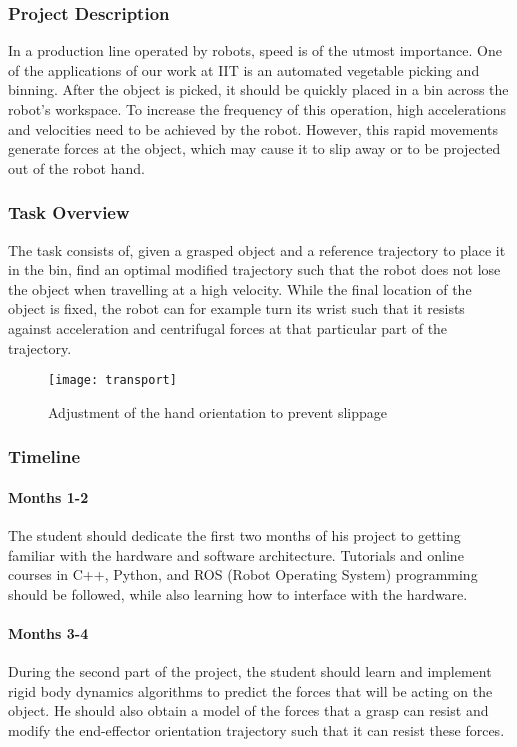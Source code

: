 
\subsubsection{Project Description}
In a production line operated by robots, speed is of the utmost importance. 
One of the applications of our work at IIT is an automated vegetable picking and binning.
After the object is picked, it should be quickly placed in a bin across the robot's workspace.
To increase the frequency of this operation, high accelerations and velocities need to be achieved by the robot.
However, this rapid movements generate forces at the object, which may cause it to slip away or to be projected out of the robot hand.

\subsubsection{Task Overview}
The task consists of, given a grasped object and a reference trajectory to place it in the bin, find an optimal modified trajectory such that the robot does not lose the object when travelling at a high velocity.
While the final location of the object is fixed, the robot can for example turn its wrist such that it resists against acceleration and centrifugal forces  at that particular part of the trajectory.

\begin{figure}[htb!]
	\centering
	\texttt{[image: transport]}
	\caption{Adjustment of the hand orientation to prevent slippage}
\end{figure}
\subsubsection{Timeline}
\paragraph{Months 1-2}
The student should dedicate the first two months of his project to getting familiar with the hardware and software architecture.
Tutorials and online courses in C++, Python, and ROS (Robot Operating System) programming should be followed, while also learning how to interface with the hardware.
\paragraph{Months 3-4}
During the second part of the project, the student should learn and implement rigid body dynamics algorithms to predict the forces that will be acting on the object.
He should also obtain a model of the forces that a grasp can resist and modify the end-effector orientation trajectory such that it can resist these forces.
